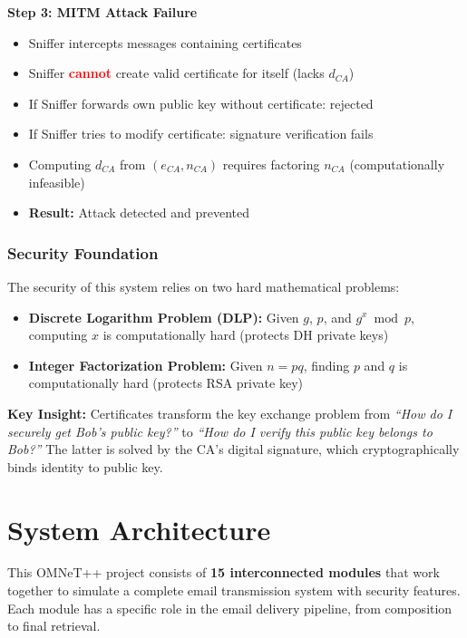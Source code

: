 \documentclass[a4paper,12pt]{extarticle}
\begin{document}
\begin{tcolorbox}[
    enhanced,
    colback=yellow!10,
    colframe=orange!80!black,
    boxrule=1.5pt,
    arc=3mm,
    left=10pt, right=10pt, top=10pt, bottom=10pt
]
\textbf{Step 3: MITM Attack Failure}
\begin{itemize}
    \item Sniffer intercepts messages containing certificates
    \item Sniffer \textcolor{red}{\textbf{cannot}} create valid certificate for itself (lacks $d_{CA}$)
    \item If Sniffer forwards own public key without certificate: rejected
    \item If Sniffer tries to modify certificate: signature verification fails
    \item Computing $d_{CA}$ from $(e_{CA}, n_{CA})$ requires factoring $n_{CA}$ (computationally infeasible)
    \item \textcolor{green!60!black}{\textbf{Result:}} Attack detected and prevented
\end{itemize}
\end{tcolorbox}

\vspace{0.3cm}

\subsubsection*{Security Foundation}

The security of this system relies on two hard mathematical problems:

\begin{itemize}[label={\color{maincolor}$\blacktriangleright$}]
    \item \textbf{Discrete Logarithm Problem (DLP):} Given $g$, $p$, and $g^x \bmod p$, computing $x$ is computationally hard (protects DH private keys)
    \item \textbf{Integer Factorization Problem:} Given $n = pq$, finding $p$ and $q$ is computationally hard (protects RSA private key)
\end{itemize}

\textbf{Key Insight:} Certificates transform the key exchange problem from \textit{``How do I securely get Bob's public key?''} to \textit{``How do I verify this public key belongs to Bob?''} The latter is solved by the CA's digital signature, which cryptographically binds identity to public key.


\section{System Architecture}

\begin{tcolorbox}[
    enhanced,
    colback=green!5!white,
    colframe=green!65!black,
    boxrule=1pt,
    arc=3mm,
    left=10pt, right=10pt, top=10pt, bottom=10pt
]
This OMNeT++ project consists of \textbf{15 interconnected modules} that work together to simulate a complete email transmission system with security features. Each module has a specific role in the email delivery pipeline, from composition to final retrieval.
\end{tcolorbox}
\end{document}
